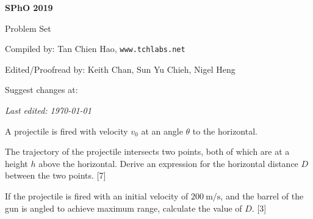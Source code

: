 \def\sphoyear{2019}
\setcounter{section}{0}
\fancyhead[L]{\textbf{SPhO \sphoyear}} 


\begin{titlepage}
\centering

{\Huge\bfseries SPhO \sphoyear}

\vspace{1cm}

{\LARGE Problem Set}

\vspace{2cm}

{\Large Compiled by: Tan Chien Hao, \texttt{www.tchlabs.net}}

\vspace{2cm}

{\Large Edited/Proofread by: Keith Chan, Sun Yu Chieh, Nigel Heng}

\vspace{2cm}

{\large Suggest changes at: \github}


\vfill

{\itshape Last edited: \today}
\end{titlepage}


\begin{problem}
    A projectile is fired with velocity $v_{0}$ at an angle $\theta$ to the horizontal.
    \begin{subproblem}
    The trajectory of the projectile intersects two points, both of which are at a height $h$ above the horizontal. Derive an expression for the horizontal distance $D$ between the two points.
    \hfill{[7]}\end{subproblem}
    \begin{subproblem}
    If the projectile is fired with an initial velocity of $\qty{200}{\m\per\s}$, and the barrel of the gun is angled to achieve maximum range, calculate the value of $D$.
    \hfill{[3]}\end{subproblem}
\end{problem}


